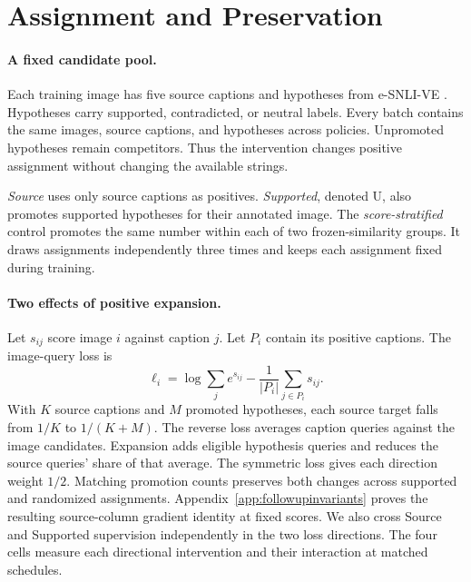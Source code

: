 \section{Assignment and Preservation}
\label{sec:newmethods}
\paragraph{A fixed candidate pool.}
Each training image has five source captions and hypotheses from e-SNLI-VE \citep{kayser2021evil}.
Hypotheses carry supported, contradicted, or neutral labels.
Every batch contains the same images, source captions, and hypotheses across policies.
Unpromoted hypotheses remain competitors.
Thus the intervention changes positive assignment without changing the available strings.

\emph{Source} uses only source captions as positives.
\emph{Supported}, denoted U, also promotes supported hypotheses for their annotated image.
The \emph{score-stratified} control promotes the same number within each of two frozen-similarity groups.
It draws assignments independently three times and keeps each assignment fixed during training.

\paragraph{Two effects of positive expansion.}
Let $s_{ij}$ score image $i$ against caption $j$.
Let $P_i$ contain its positive captions.
The image-query loss is
\begin{equation}
\ell_i=\log\sum_j e^{s_{ij}}-\frac{1}{|P_i|}\sum_{j\in P_i}s_{ij}.
\label{eq:newrow}
\end{equation}
With $K$ source captions and $M$ promoted hypotheses, each source target falls from $1/K$ to $1/(K+M)$.
The reverse loss averages caption queries against the image candidates.
Expansion adds eligible hypothesis queries and reduces the source queries' share of that average.
The symmetric loss gives each direction weight $1/2$.
Matching promotion counts preserves both changes across supported and randomized assignments.
Appendix~\ref{app:followupinvariants} proves the resulting source-column gradient identity at fixed scores.
We also cross Source and Supported supervision independently in the two loss directions.
The four cells measure each directional intervention and their interaction at matched schedules.

